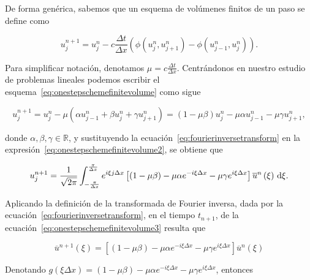 De forma genérica, sabemos que un esquema de volúmenes finitos de un
paso se define como

\begin{equation}\label{eq:onestepschemefinitevolume}
  u^{n+1}_{j}=
  u^{n}_{j}-
  c\frac{\Delta t}{\Delta x}
  \left(
  \phi\left(u^{n}_{j},u^{n}_{j+1}\right)-
  \phi\left(u^{n}_{j-1},u^{n}_{j}\right)
  \right).
\end{equation}

Para simplificar notación, denotamos
\begin{math}
  \mu=
  c\frac{\Delta t}{\Delta x}
\end{math}.
Centrándonos en nuestro estudio de problemas lineales podemos
escribir el esquema~\eqref{eq:onestepschemefinitevolume} como sigue

\begin{equation}\label{eq:onestepschemefinitevolume2}
  u^{n+1}_{j}=
  u^{n}_{j}-
  \mu
  \left(
  \alpha u^{n}_{j-1}+
  \beta u^{n}_{j}+
  \gamma u^{n}_{j+1}
  \right)=
  \left(1-\mu\beta\right)
  u_j^n-
  \mu\alpha
  u^{n}_{j-1}-
  \mu\gamma
  u^{n}_{j+1},
\end{equation}

donde $\alpha,\beta,\gamma\in\mathbb{R}$, y sustituyendo la
ecuación~\eqref{eq:fourierinversetransform} en la
expresión~\eqref{eq:onestepschemefinitevolume2}, se obtiene que

\begin{equation}\label{eq:onestepschemefinitevolume3}
  u^{n+1}_{j}=
  \frac{1}{\sqrt{2\pi}}
  \int_{-\frac{\pi}{\Delta x}}^{\frac{\pi}{\Delta x}}
  e^{i\xi j\Delta x}
  \left[
    \left(1-\mu\beta\right)-
    \mu\alpha
    e^{-i\xi\Delta x}-
    \mu\gamma
    e^{i\xi\Delta x}
    \right]
  \overline{u}^{n}\left(\xi\right)
  \dl\xi.
\end{equation}

Aplicando la definición de la transformada de Fourier inversa, dada
por la ecuación~\eqref{eq:fourierinversetransform}, en el tiempo
$t_{n+1}$, de la ecuación~\eqref{eq:onestepschemefinitevolume3}
resulta que

\begin{equation*}
  \overline{u}^{n+1}
  \left(\xi\right)=
  \left[
    \left(1-\mu\beta\right)-
    \mu\alpha
    e^{-i\xi\Delta x}-
    \mu\gamma e^{i\xi\Delta x}
    \right]
  \overline{u}^{n}
  \left(\xi\right)
\end{equation*}

Denotando
\begin{math}
  g
  \left(\xi\Delta x\right)=
  \left(1-\mu\beta\right)-
  \mu\alpha
  e^{-i\xi\Delta x}-
  \mu\gamma
  e^{i\xi\Delta x}
\end{math},
entonces

